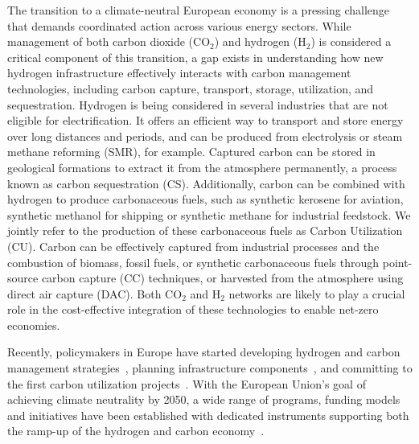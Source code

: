 \documentclass[twocolumn]{article}
\newcommand{\carbon}{CO$_2$}
\newcommand{\hydrogen}{H$_2$}
\begin{document}
The transition to a climate-neutral European economy is a pressing challenge that demands coordinated action across various energy sectors. While management of both carbon dioxide (\carbon{}) and hydrogen (\hydrogen{}) is considered a critical component of this transition, a gap exists in understanding how new hydrogen infrastructure effectively interacts with carbon management technologies, including carbon capture, transport, storage, utilization, and sequestration. Hydrogen is being considered in several industries that are not eligible for electrification. It offers an efficient way to transport and store energy over long distances and periods, and can be produced from electrolysis or steam methane reforming (SMR), for example. Captured carbon can be stored in geological formations to extract it from the atmosphere permanently, a process known as carbon sequestration (CS). Additionally, carbon can be combined with hydrogen to produce carbonaceous fuels, such as synthetic kerosene for aviation, synthetic methanol for shipping or synthetic methane for industrial feedstock. We jointly refer to the production of these carbonaceous fuels as Carbon Utilization (CU). Carbon can be effectively captured from industrial processes and the combustion of biomass, fossil fuels, or synthetic carbonaceous fuels through point-source carbon capture (CC) techniques, or harvested from the atmosphere using direct air capture (DAC). Both \carbon{} and \hydrogen{} networks are likely to play a crucial role in the cost-effective integration of these technologies to enable net-zero economies.

Recently, policymakers in Europe have started developing hydrogen and carbon management strategies~\cite{GermanyDevelopingStrategy2023,CarbonManagementStrategie}, planning infrastructure components~\cite{CONetz}, and committing to the first carbon utilization projects~\cite{EFuelsPilotPlant2022,OrstedAssumesFull,GROUNDBREAKINGEFUELPRODUCTION,DLREfuelsDLR}. With the European Union's goal of achieving climate neutrality by 2050, a wide range of programs, funding models and initiatives have been established with dedicated instruments supporting both the ramp-up of the hydrogen and carbon economy~\cite{eu2023netzero,europeangreendeal,europeaninnovationfund}.
\end{document}

